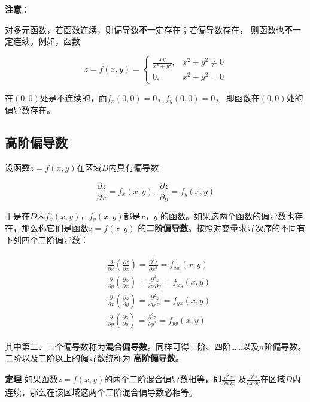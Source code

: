 \documentclass[12pt, a4paper]{article}
\numberwithin{equation}{section}
\newcommand{\pderiv}[2]{\frac{\partial #1}{\partial #2}}
\begin{document}
    \textbf{注意}：

    对多元函数，若函数连续，则偏导数\textbf{不}一定存在；若偏导数存在，
    则函数也\textbf{不}一定连续。例如，函数

    $$
        z=f(x, y)= \begin{cases}\frac{x y}{x^2+y^2}, & x^2+y^2 \neq 0 \\ 0, & x^2+y^2=0\end{cases}
    $$

    在\(\left(0,0\right)\)处是不连续的，而\(f_x\left(0,0\right)=0\)，\(f_y\left(0,0\right)=0\)，
    即函数在\(\left(0,0\right)\)处的偏导数存在。

\subsection{高阶偏导数}

    设函数\(z=f\left(x,y\right)\)在区域\(D\)内具有偏导数

    $$
        \pderiv{z}{x}=f_x\left(x,y\right),\; \pderiv{z}{y}=f_y\left(x,y\right)
    $$

    于是在\(D\)内\(f_x\left(x,y\right)\)，\(f_y\left(x,y\right)\)都是\(x\)，\(y\)
    的函数。如果这两个函数的偏导数也存在，那么称它们是函数\(z=f\left(x,y\right)\)
    的\textbf{二阶偏导数}。按照对变量求导次序的不同有下列四个二阶偏导数：

    \begin{align}
        \begin{aligned}
            & \frac{\partial}{\partial x}\left(\frac{\partial z}{\partial x}\right)=\frac{\partial^2 z}{\partial x^2}=f_{x x}(x, y) \\
            & \frac{\partial}{\partial y}\left(\frac{\partial z}{\partial x}\right)=\frac{\partial^2 z}{\partial x \partial y}=f_{x y}(x, y) \\
            & \frac{\partial}{\partial x}\left(\frac{\partial z}{\partial y}\right)=\frac{\partial^2 z}{\partial y \partial x}=f_{y x}(x, y) \\
            & \frac{\partial}{\partial y}\left(\frac{\partial z}{\partial y}\right)=\frac{\partial^2 z}{\partial y^2}=f_{y y}(x, y)
        \end{aligned}
    \end{align}
    
    其中第二、三个偏导数称为\textbf{混合偏导数}。同样可得三阶、四阶……以及\(n\)阶偏导数。二阶以及二阶以上的偏导数统称为
    \textbf{高阶偏导数}。

    \textbf{定理 \quad} 如果函数\(z=f\left(x,y\right)\)的两个二阶混合偏导数相等，即\(\frac{\partial^2 z}{\partial y \partial x}\)
    及\(\frac{\partial^2 z}{\partial x \partial y}\)在区域\(D\)内连续，那么在该区域这两个二阶混合偏导数必相等。
\end{document}
